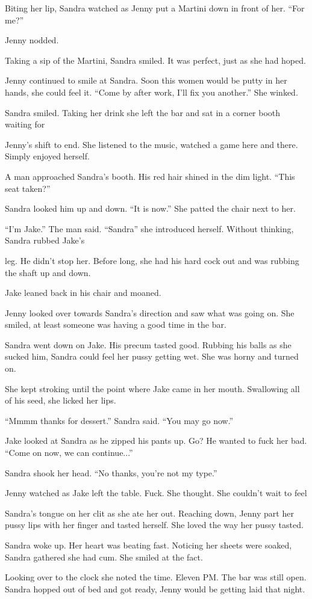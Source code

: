 Biting her lip, Sandra watched as Jenny put a Martini down in front of her. “For me?”

Jenny nodded.

Taking a sip of the Martini, Sandra smiled. It was perfect, just as she had hoped.

Jenny continued to smile at Sandra. Soon this women would be putty in her hands, she could feel it. “Come by after work, I’ll fix you another.” She winked.

Sandra smiled. Taking her drink she left the bar and sat in a corner booth waiting for

Jenny’s shift to end. She listened to the music, watched a game here and there. Simply enjoyed herself.

A man approached Sandra’s booth. His red hair shined in the dim light. “This seat taken?”

Sandra looked him up and down. “It is now.” She patted the chair next to her.

“I’m Jake.” The man said.
“Sandra” she introduced herself. Without thinking, Sandra rubbed Jake’s

leg. He didn’t stop her. Before long, she had his hard cock out and was rubbing the shaft up and down.

Jake leaned back in his chair and moaned.

Jenny looked over towards Sandra’s direction and saw what was going on. She smiled, at least someone was having a good time in the bar.

Sandra went down on Jake. His precum tasted good. Rubbing his balls as she sucked him, Sandra could feel her pussy getting wet. She was horny and turned on.

She kept stroking until the point where Jake came in her mouth. Swallowing all of his seed, she licked her lips.

“Mmmm thanks for dessert.” Sandra said. “You may go now.”

Jake looked at Sandra as he zipped his pants up. Go? He wanted to fuck her bad. “Come on now, we can continue...”

Sandra shook her head. “No thanks, you’re not my type.”

Jenny watched as Jake left the table. Fuck. She thought. She couldn’t wait to feel

Sandra’s tongue on her clit as she ate her out. Reaching down, Jenny part her pussy lips with her finger and tasted herself. She loved the way her pussy tasted.

Sandra woke up. Her heart was beating fast. Noticing her sheets were soaked, Sandra gathered she had cum. She smiled at the fact.

Looking over to the clock she noted the time. Eleven PM. The bar was still open. Sandra hopped out of bed and got ready, Jenny would be getting laid that night. 

